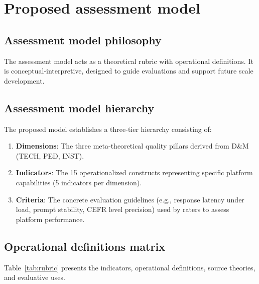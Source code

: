 \documentclass[11pt,a4paper]{article}
\begin{document}
\section{Proposed assessment model}
\label{sec:assessment_model}

\subsection{Assessment model philosophy}

\noindent The assessment model acts as a theoretical rubric with operational definitions. It is conceptual-interpretive, designed to guide evaluations and support future scale development.

\subsection{Assessment model hierarchy}

The proposed model establishes a three-tier hierarchy consisting of:
\begin{enumerate}
  \item \textbf{Dimensions}: The three meta-theoretical quality pillars derived from D\&M (TECH, PED, INST).
  \item \textbf{Indicators}: The 15 operationalized constructs representing specific platform capabilities (5 indicators per dimension).
  \item \textbf{Criteria}: The concrete evaluation guidelines (e.g., response latency under load, prompt stability, CEFR level precision) used by raters to assess platform performance.
\end{enumerate}

\subsection{Operational definitions matrix}

Table~\ref{tab:rubric} presents the indicators, operational definitions, source theories, and evaluative uses.
\end{document}
